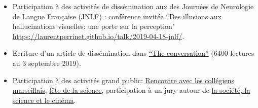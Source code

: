 \begin{itemize}

	\item Participation à des activités de dissémination aux des Journées de Neurologie de Langue Française (JNLF) : conférence invitée  ``Des illusions aux hallucinations visuelles: une porte sur la perception" \url{https://laurentperrinet.github.io/talk/2019-04-18-jnlf/}. 

	\item Ecriture d'un article de dissémination dans \href{https://theconversation.com/illusions-et-hallucinations-visuelles-une-porte-sur-la-perception-117389}{``The conversation''} (6400 lectures au 3 septembre 2019). 

	\item Participation à des activités grand public: \href{https://laurentperrinet.github.io/talk/2019-01-10-polly-maggoo/}{Rencontre avec les collégiens marseillais}, \href{https://laurentperrinet.github.io/talk/2018-10-10-polly-maggoo/}{fête de la science}, participation à un jury autour de \href{https://laurentperrinet.github.io/talk/2017-11-17-festival-interferences/}{la société, la science et le cinéma}. 

%
%

	
%
%
%
	
\end{itemize}



